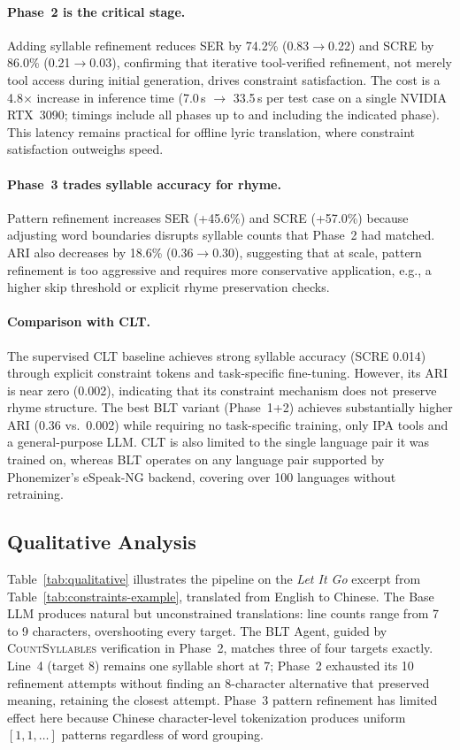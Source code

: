 \documentclass[11pt]{article}
\begin{document}
\paragraph{Phase~2 is the critical stage.}
Adding syllable refinement reduces SER by 74.2\% (0.83$\to$0.22) and SCRE by 86.0\% (0.21$\to$0.03), confirming that iterative tool-verified refinement, not merely tool access during initial generation, drives constraint satisfaction.
The cost is a 4.8$\times$ increase in inference time (7.0\,s $\to$ 33.5\,s per test case on a single NVIDIA RTX~3090; timings include all phases up to and including the indicated phase).
This latency remains practical for offline lyric translation, where constraint satisfaction outweighs speed.

\paragraph{Phase~3 trades syllable accuracy for rhyme.}
Pattern refinement increases SER (+45.6\%) and SCRE (+57.0\%) because adjusting word boundaries disrupts syllable counts that Phase~2 had matched.
ARI also decreases by 18.6\% (0.36$\to$0.30), suggesting that at scale, pattern refinement is too aggressive and requires more conservative application, e.g., a higher skip threshold or explicit rhyme preservation checks.

\paragraph{Comparison with CLT.}
The supervised CLT baseline achieves strong syllable accuracy (SCRE 0.014) through explicit constraint tokens and task-specific fine-tuning.
However, its ARI is near zero (0.002), indicating that its constraint mechanism does not preserve rhyme structure.
The best BLT variant (Phase~1+2) achieves substantially higher ARI (0.36 vs.\ 0.002) while requiring no task-specific training, only IPA tools and a general-purpose LLM.
CLT is also limited to the single language pair it was trained on, whereas BLT operates on any language pair supported by Phonemizer's eSpeak-NG backend, covering over 100 languages without retraining.

\subsection{Qualitative Analysis}

Table~\ref{tab:qualitative} illustrates the pipeline on the \emph{Let It Go} excerpt from Table~\ref{tab:constraints-example}, translated from English to Chinese.
The Base LLM produces natural but unconstrained translations: line counts range from 7 to 9 characters, overshooting every target.
The BLT Agent, guided by \textsc{CountSyllables} verification in Phase~2, matches three of four targets exactly.
Line~4 (target 8) remains one syllable short at 7; Phase~2 exhausted its 10 refinement attempts without finding an 8-character alternative that preserved meaning, retaining the closest attempt.
Phase~3 pattern refinement has limited effect here because Chinese character-level tokenization produces uniform $[1, 1, \ldots]$ patterns regardless of word grouping.
\end{document}
